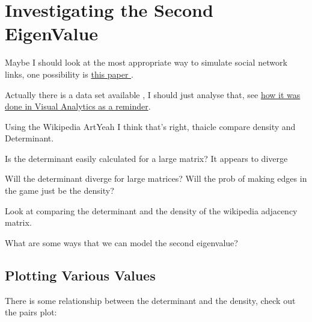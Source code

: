 \documentclass[11pt]{article}
\begin{document}
\section{Investigating the Second EigenValue}
\label{sec:org3b1b856}

Maybe I should look at the most appropriate way to simulate social network links, one possibility is \href{https://crpit.scem.westernsydney.edu.au/confpapers/CRPITV144Zeng.pdf}{this paper } \cite{zengPracticalSimulationMethod2013}.

Actually there is a data set available
 \cite{garritanoWikipediaArticleNetworks2019}, I should just analyse that, see \href{file:///home/ryan/Dropbox/DataSci/Visual\_Analytics/Assessment/the-marvel-universe-social-network/plotly3d\_Marvel.r}{how
it was done in Visual Analytics as a reminder}.

Using the Wikipedia ArtYeah I think that's right, thaicle compare density and Determinant.

Is the determinant easily calculated for a large matrix?
  It appears to diverge

Will the determinant diverge for large matrices?
Will the prob of making edges in the game just be the density?

Look at comparing the determinant and the density of the wikipedia adjacency matrix.

What are some ways that we can model the second eigenvalue?

\subsection{Plotting Various Values}
\label{sec:orgc863a2e}

There is some relationship between the determinant and the density, check out the pairs plot:
\end{document}
